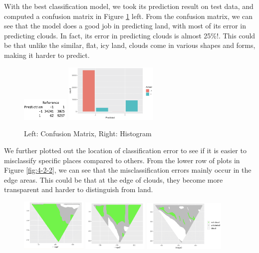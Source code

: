 \documentclass[11pt]{article}
\begin{document}
With the best classification model, we took its prediction result on test data, and computed a confusion matrix in Figure \ref{fig:4-2-1} left. From the confusion matrix, we can see that the model does a good job in predicting land, with most of its error in predicting clouds. In fact, its error in predicting clouds is almost 25\%!. This could be that unlike the similar, flat, icy land, clouds come in various shapes and forms, making it harder to predict.

\begin{figure}[h]
\includegraphics[width=0.2\textwidth]{4-2-1.jpeg}
\includegraphics[width=0.4\textwidth]{4-2-2.jpeg}
\centering
\caption{Left: Confusion Matrix, Right: Histogram}
\label{fig:4-2-1}
\centering
\end{figure}

We further plotted out the location of classification error to see if it is easier to misclassify specific places compared to others. From the lower row of plots in Figure \ref{fig:4-2-2}, we can see that the misclassification errors mainly occur in the edge areas. This could be that at the edge of clouds, they become more transparent and harder to distinguish from land.

\begin{figure}[h]
\includegraphics[width=0.28\textwidth]{4-2-3.jpeg}
\includegraphics[width=0.28\textwidth]{4-2-4.jpeg}
\includegraphics[width=0.35\textwidth]{4-2-5.jpeg}
\centering
\end{figure}
\end{document}

